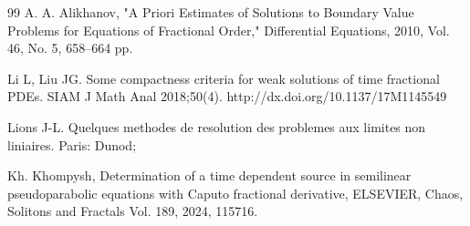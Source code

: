 \documentclass[12pt]{amsart}
\theoremstyle{definition}
\numberwithin{equation}{section}
\begin{document}
\begin{thebibliography}{99}
 A. A. Alikhanov, "A Priori Estimates of Solutions to Boundary Value Problems for Equations of Fractional Order," Differential Equations, 2010, Vol. 46, No. 5, 658–664 pp.

Li L, Liu JG. Some compactness criteria for weak solutions of time fractional
PDEs. SIAM J Math Anal 2018;50(4). http://dx.doi.org/10.1137/17M1145549






  Lions J-L. Quelques methodes de resolution des problemes aux limites non
liniaires. Paris: Dunod; 



 Kh. Khompysh, Determination of a time dependent source in semilinear pseudoparabolic equations with Caputo fractional derivative, ELSEVIER, Chaos, Solitons and Fractals Vol. 189,  2024, 115716.









\end{thebibliography}
\end{document}
